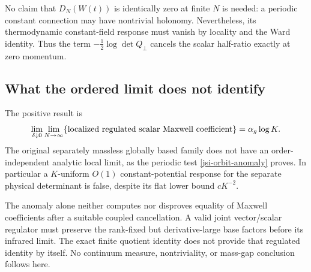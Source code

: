 No claim that \(D_N(W(t))\) is identically zero at finite \(N\)
is needed: a periodic constant connection may have nontrivial
holonomy. Nevertheless, its thermodynamic constant-field
response must vanish by locality and the Ward identity.
Thus the term \(-\frac12\log\det Q_\perp\) cancels the scalar
half-ratio exactly at zero momentum.

\subsection{What the ordered limit does not identify}
\label{jsi-scope}

The positive result is
\[
 \lim_{\delta\downarrow0}\lim_{N\to\infty}
       \{\hbox{localized regulated scalar Maxwell coefficient}\}
                         =\alpha_g\log K.
\]
The original separately massless globally based family does not
have an order-independent analytic local limit, as the periodic
test \eqref{jsi-orbit-anomaly} proves.
In particular a \(K\)-uniform \(O(1)\) constant-potential response
for the separate physical determinant is false, despite its
flat lower bound \(cK^{-2}\).

The anomaly alone neither computes nor disproves equality of
Maxwell coefficients after a suitable coupled cancellation.
A valid joint vector/scalar regulator must preserve the
rank-fixed but derivative-large base factors before its
infrared limit. The exact finite quotient identity does not
provide that regulated identity by itself. No continuum
measure, nontriviality, or mass-gap conclusion follows here.
